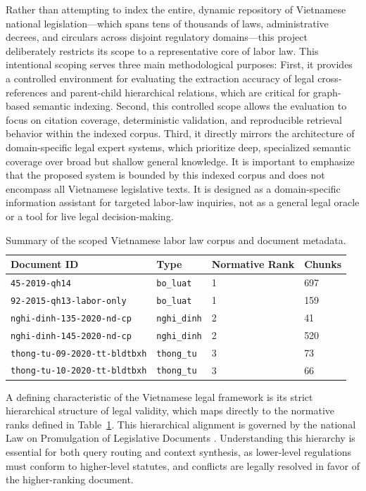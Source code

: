 Rather than attempting to index the entire, dynamic repository of Vietnamese national legislation—which spans tens of thousands of laws, administrative decrees, and circulars across disjoint regulatory domains—this project deliberately restricts its scope to a representative core of labor law. This intentional scoping serves three main methodological purposes:
First, it provides a controlled environment for evaluating the extraction accuracy of legal cross-references and parent-child hierarchical relations, which are critical for graph-based semantic indexing.
Second, this controlled scope allows the evaluation to focus on citation coverage, deterministic validation, and reproducible retrieval behavior within the indexed corpus.
Third, it directly mirrors the architecture of domain-specific legal expert systems, which prioritize deep, specialized semantic coverage over broad but shallow general knowledge.
It is important to emphasize that the proposed system is bounded by this indexed corpus and does not encompass all Vietnamese legislative texts. It is designed as a domain-specific information assistant for targeted labor-law inquiries, not as a general legal oracle or a tool for live legal decision-making.

\begin{table}[H]
  \centering
  \caption{Summary of the scoped Vietnamese labor law corpus and document metadata.}
  \label{tab:corpus-documents}
  \begin{tabular}{llll}
    \toprule
    Document ID & Type & Normative Rank & Chunks \\
    \midrule
    \texttt{45-2019-qh14} & \texttt{bo\_luat} & 1 & 697 \\
    \texttt{92-2015-qh13-labor-only} & \texttt{bo\_luat} & 1 & 159 \\
    \texttt{nghi-dinh-135-2020-nd-cp} & \texttt{nghi\_dinh} & 2 & 41 \\
    \texttt{nghi-dinh-145-2020-nd-cp} & \texttt{nghi\_dinh} & 2 & 520 \\
    \texttt{thong-tu-09-2020-tt-bldtbxh} & \texttt{thong\_tu} & 3 & 73 \\
    \texttt{thong-tu-10-2020-tt-bldtbxh} & \texttt{thong\_tu} & 3 & 66 \\
    \bottomrule
  \end{tabular}
\end{table}

A defining characteristic of the Vietnamese legal framework is its strict hierarchical structure of legal validity, which maps directly to the normative ranks defined in Table~\ref{tab:corpus-documents}. This hierarchical alignment is governed by the national Law on Promulgation of Legislative Documents \cite{vietnam2015law80}. Understanding this hierarchy is essential for both query routing and context synthesis, as lower-level regulations must conform to higher-level statutes, and conflicts are legally resolved in favor of the higher-ranking document.

